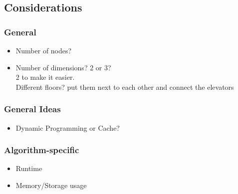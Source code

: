 \documentclass[11pt,a4paper]{article}
\begin{document}
\subsection{Considerations}
\subsubsection[short]{General}
\begin{itemize}
	\item Number of nodes?
	\item Number of dimensions? 2 or 3?\\
	      2 to make it easier.\\
	      Different floors? put them next to each other and connect the elevators
\end{itemize}

\subsubsection{General Ideas}
\begin{itemize}
	\item Dynamic Programming or Cache?
\end{itemize}
\subsubsection{Algorithm-specific}
\begin{itemize}
	\item Runtime
	\item Memory/Storage usage
\end{itemize}
\end{document}
